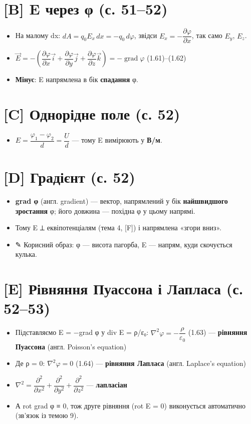 \documentclass[11pt,a4paper,oneside]{book}
\newcommand{\pen}{{\sffamily\color{accent}✎}}
\begin{document}
\section*{[B] E через φ (с. 51–52)}
\begin{itemize}
\item На малому dx: $dA = q_0E_x\,dx = -q_0\,d\varphi$, звідси $E_x = -\dfrac{\partial\varphi}{\partial x}$, так само $E_y$, $E_z$.
\item $\vec E = -\left(\dfrac{\partial\varphi}{\partial x}\vec i + \dfrac{\partial\varphi}{\partial y}\vec j + \dfrac{\partial\varphi}{\partial z}\vec k\right) = -\operatorname{grad}\varphi$ (1.61)–(1.62)
\item \textbf{Мінус}: E напрямлена в бік \textbf{спадання} φ.
\end{itemize}

\section*{[C] Однорідне поле (с. 52)}
\begin{itemize}
\item $E = \dfrac{\varphi_1-\varphi_2}{d} = \dfrac{U}{d}$ — тому E вимірюють у \textbf{В/м}.
\end{itemize}

\section*{[D] Градієнт (с. 52)}
\begin{itemize}
\item \textbf{grad φ} (англ. gradient) — вектор, напрямлений у бік \textbf{найшвидшого зростання} φ; його довжина — похідна φ у цьому напрямі.
\item Тому E ⟂ еквіпотенціалям (тема 4, [F]) і напрямлена «згори вниз».
\item \pen{} Корисний образ: φ — висота пагорба, E — напрям, куди скочується кулька.
\end{itemize}

\section*{[E] Рівняння Пуассона і Лапласа (с. 52–53)}
\begin{itemize}
\item Підставляємо E = −grad φ у div E = ρ/ε₀:
$\nabla^2\varphi = -\dfrac{\rho}{\varepsilon_0}$ (1.63) — \textbf{рівняння Пуассона} (англ. Poisson's equation)
\item Де ρ = 0: $\nabla^2\varphi = 0$ (1.64) — \textbf{рівняння Лапласа} (англ. Laplace's equation)
\item $\nabla^2 = \dfrac{\partial^2}{\partial x^2}+\dfrac{\partial^2}{\partial y^2}+\dfrac{\partial^2}{\partial z^2}$ — \textbf{лапласіан}
\item А rot grad φ ≡ 0, тож друге рівняння (rot E = 0) виконується автоматично (зв'язок із темою 9).
\end{itemize}
\end{document}
